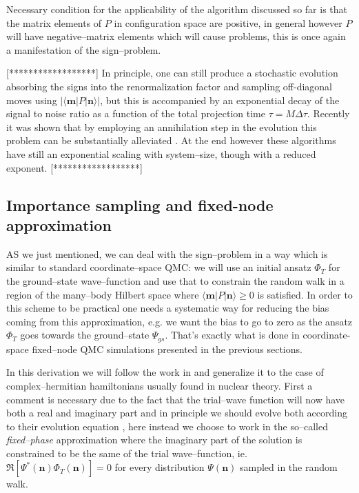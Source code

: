 Necessary condition for the applicability of the algorithm discussed so far is that the matrix elements of $P$ in configuration space are positive, in general however $P$ will have negative--matrix 
elements which will cause problems, this is once again a manifestation of the sign--problem.

[******************]
In principle, one can still produce a stochastic evolution absorbing the signs into the renormalization factor and sampling off-diagonal moves using $\left \vert \langle \mathbf{m} \lvert P \rvert \mathbf{n} \rangle \right\vert$,
but this is accompanied by an exponential decay of the signal to noise ratio as a function of the total projection time $\tau = M \Delta\tau$. Recently it was shown that by employing an annihilation step in the evolution
this problem can be substantially alleviated \cite{Booth,Booth2013,Petruzielo2012}. At the end however these algorithms have still an exponential scaling with system--size, though with a reduced exponent.
[******************]

\subsection{Importance sampling and fixed-node approximation}
\label{subsect:CCDMC-IS}
AS we just mentioned, we can deal with the sign--problem in a way which is similar to standard coordinate--space QMC: we will use an initial ansatz $\Phi_T$ for the ground--state wave--function and use that
to constrain the random walk in a region of the many--body Hilbert space where $\langle \mathbf{m} \lvert P \rvert \mathbf{n} \rangle \geq 0$ is satisfied. In order to this scheme to be practical one needs a systematic way for 
reducing the bias coming from this approximation, e.g. we want the bias to go to zero as the ansatz $\Phi_T$ goes towards the ground--state $\Psi_{gs}$. 
That's exactly what is done in coordinate-space fixed--node QMC simulations presented in the previous sections.

In this derivation we will follow the work in \cite{TenHaaf1995,Sorella2000} and generalize it to the case of complex--hermitian hamiltonians usually found in nuclear theory. 
First a comment is necessary due to the fact that the trial--wave function will now have both a real and imaginary part and in principle we should evolve both according to their 
evolution equation , here instead we choose to work in the so--called {\it fixed--phase} approximation where the imaginary part of the solution 
is constrained to be the same of the trial wave--function, ie. $\Re [\Psi^*(\mathbf{n})\Phi_T(\mathbf{n})] = 0$ for every distribution $\Psi(\mathbf{n})$ sampled in the random walk. 

